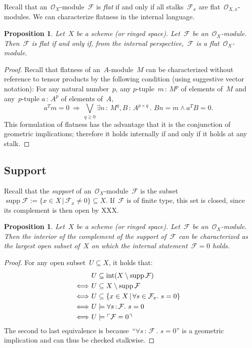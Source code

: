 \documentclass[10pt]{amsart}
\theoremstyle{definition}
\theoremstyle{plain}
\newtheorem{prop}[defn]{Proposition}
\theoremstyle{remark}
\newcommand{\F}{\mathcal{F}}
\renewcommand{\O}{\mathcal{O}}
\DeclareMathOperator{\Int}{int}
\DeclareMathOperator{\supp}{supp}
\newcommand{\?}{\,{:}\,}
\renewcommand{\_}{\mathpunct{.}\,}
\newcommand{\speak}[1]{\ulcorner\text{\textnormal{#1}}\urcorner}
\begin{document}
Recall that an~$\O_X$-module~$\F$ is \emph{flat} if and only if all
stalks~$\F_x$ are flat~$\O_{X,x}$-modules. We can characterize flatness in the
internal language.
\begin{prop}Let~$X$ be a scheme (or ringed space). Let~$\F$ be
an~$\O_X$-module. Then~$\F$ is flat if and only if, from the internal
perspective,~$\F$ is a flat~$\O_X$-module.
\end{prop}
\begin{proof}
Recall that flatness of an~$A$-module~$M$ can be characterized without
reference to tensor products by the following condition (using
suggestive vector notation): For any natural number~$p$,
any $p$-tuple~$m \? M^p$ of elements of~$M$ and
any~$p$-tuple $a \? A^p$ of elements of~$A$,
\[
  a^T m = 0 \ \Longrightarrow\ 
  \bigvee\limits_{q \geq 0} \exists n\?M^q, B\?A^{p \times q}\_
  Bn = m \wedge a^T B = 0. \]
This formulation of flatness has the advantage that it is the conjunction of
geometric implications; therefore it holds internally if and only if it holds at
any stalk.
\end{proof}



\subsection{Support} Recall that the \emph{support} of an~$\O_X$-module~$\F$ is
the subset~$\supp\F := \{ x \in X \,|\, \F_x \neq 0 \} \subseteq X$. If~$\F$ is
of finite type, this set is closed, since its complement is then open by XXX.

\begin{prop}\label{prop:characterization-support}
Let~$X$ be a scheme (or ringed space). Let~$\F$ be
an~$\O_X$-module. Then the interior of the complement of the support of~$\F$
can be characterized as the largest open subset of~$X$ on which the internal
statement~$\F = 0$ holds.
\end{prop}
\begin{proof}
For any open subset~$U \subseteq X$, it holds that:
\begin{align*}
  &\ U \subseteq \Int(X \setminus \supp \F) \\
  \Longleftrightarrow&\ U \subseteq X \setminus \supp \F \\
  \Longleftrightarrow&\ U \subseteq \{ x \in X \,|\, \forall s \in \F_x\_ s = 0 \} \\
  \Longleftrightarrow&\ U \models \forall s\?\F\_ s = 0 \\
  \Longleftrightarrow&\ U \models \speak{$\F = 0$}
\end{align*}
The second to last equivalence is because~``$\forall s\?\F\_ s = 0$'' is a
geometric implication and can thus be checked stalkwise.
\end{proof}
\end{document}
